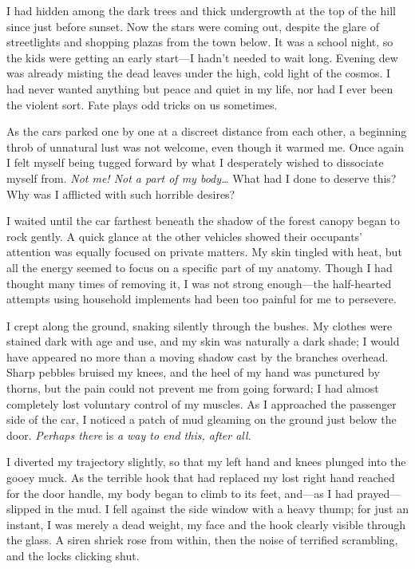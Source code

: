 
I had hidden among the dark trees and thick undergrowth at the top of
the hill since just before sunset. Now the stars were coming out,
despite the glare of streetlights and shopping plazas from the town
below. It was a school night, so the kids were getting an early
start---I hadn't needed to wait long. Evening dew was already misting
the dead leaves under the high, cold light of the cosmos. I had never
wanted anything but peace and quiet in my life, nor had I ever been the
violent sort. Fate plays odd tricks on us sometimes.

As the cars parked one by one at a discreet distance from each other, a
beginning throb of unnatural lust was not welcome, even though it warmed
me. Once again I felt myself being tugged forward by what I desperately
wished to dissociate myself from. \emph{Not me! Not a part of my body\ldots}
 What had I done to deserve this? Why was I afflicted with such
horrible desires?

I waited until the car farthest beneath the shadow of the forest canopy
began to rock gently. A quick glance at the other vehicles showed their
occupants' attention was equally focused on private matters. My skin
tingled with heat, but all the energy seemed to focus on a specific part
of my anatomy. Though I had thought many times of removing it, I was not
strong enough---the half-hearted attempts using household implements had
been too painful for me to persevere.

I crept along the ground, snaking silently through the bushes. My
clothes were stained dark with age and use, and my skin was naturally a
dark shade; I would have appeared no more than a moving shadow cast by
the branches overhead. Sharp pebbles bruised my knees, and the heel of
my hand was punctured by thorns, but the pain could not prevent me from
going forward; I had almost completely lost voluntary control of my
muscles. As I approached the passenger side of the car, I noticed a
patch of mud gleaming on the ground just below the door. \emph{Perhaps
there} is \emph{a way to end this, after all.}

I diverted my trajectory slightly, so that my left hand and knees
plunged into the gooey muck. As the terrible hook that had replaced my
lost right hand reached for the door handle, my body began to climb to
its feet, and---as I had prayed---slipped in the mud. I fell against the
side window with a heavy thump; for just an instant, I was merely a dead
weight, my face and the hook clearly visible through the glass. A siren
shriek rose from within, then the noise of terrified scrambling, and the
locks clicking shut.

